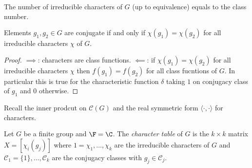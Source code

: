 \documentclass[a4paper]{article}
\newcommand{\ccl}{{\mathcal C}} %
\theoremstyle{definition}
\begin{document}
\begin{corollary}
  \label{cor:number of irreducible equals to class number}
  The number of irreducible characters of \(G\) (up to equivalence) equals to the class number.
\end{corollary}

\begin{corollary}
  Elements \(g_1, g_2 \in G\) are conjugate if and only if \(\chi(g_1) = \chi(g_2)\) for all irreducible characters \(\chi\) of \(G\).
\end{corollary}

\begin{proof}
  \(\implies\): characters are class functions. \(\impliedby\): if \(\chi(g_1) = \chi(g_2)\) for all irreducible characters \(\chi\) then \(f(g_1) = f(g_2)\) for all class fucntions of \(G\). In particular this is true for the characteristic function \(\delta\) taking \(1\) on conjugacy class of \(g_1\) and \(0\) otherwise.
\end{proof}

Recall the inner prodcut on \(\ccl(G)\) and the real symmetric form \(\langle \cdot, \cdot \rangle\) for characters.

\begin{definition}
  Let \(G\) be a finite group and \(\F = \C\). The \emph{character table} of \(G\) is the \(k \times k\) matrix \(X = [\chi_i(g_j)]\) where \(1 = \chi_1, \dots, \chi_k\) are the irreducible characters of \(G\) and \(\ccl_1 = \{1\}, \dots, \ccl_k\) are the conjugacy classes with \(g_j \in \ccl_j\).
\end{definition}
\end{document}
